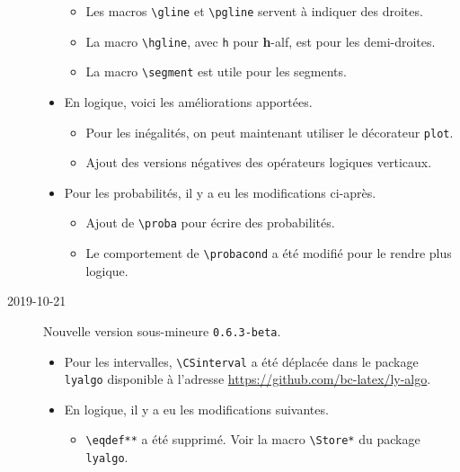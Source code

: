 \documentclass[12pt,a4paper]{article}
\newcommand\env[1]{\texttt{#1}}
\newcommand\macro[1]{\env{\textbackslash{}#1}}
\theoremstyle{definition}
\begin{document}
\begin{description}
\begin{itemize}[itemsep=.5em]
\begin{itemize}[itemsep=.5em]
            \item Les macros \macro{gline} et \macro{pgline} servent à indiquer des droites.
    
            \item La macro \macro{hgline}, avec \verb+h+ pour \textbf{h}-alf, est pour les demi-droites.
    
            \item La macro \macro{segment} est utile pour les segments.
        \end{itemize}
    
    
        \item En logique, voici les améliorations apportées.
        \begin{itemize}[itemsep=.5em]
            \item Pour les inégalités, on peut maintenant utiliser le décorateur \verb+plot+.
    
    		\item Ajout des versions négatives des opérateurs logiques verticaux.
        \end{itemize}
    
    
        \item Pour les probabilités, il y a eu les modifications ci-après.
        \begin{itemize}[itemsep=.5em]
            \item Ajout de \macro{proba} pour écrire des probabilités.
    
    		\item Le comportement de \macro{probacond} a été modifié pour le rendre plus logique.
        \end{itemize}
    \end{itemize}


    \medskip
    \item[2019-10-21] Nouvelle version sous-mineure \verb+0.6.3-beta+.
    
    \begin{itemize}[itemsep=.5em]
        \item Pour les intervalles, \macro{CSinterval} a été déplacée dans le package \verb+lyalgo+ disponible à l'adresse \url{https://github.com/bc-latex/ly-algo}.
    
    
        \item En logique, il y a eu les modifications suivantes.
        \begin{itemize}[itemsep=.5em]
            \item \macro{eqdef**} a été supprimé. Voir la macro \macro{Store*} du package \verb+lyalgo+.
    

\end{itemize}
\end{itemize}
\end{description}
\end{document}
